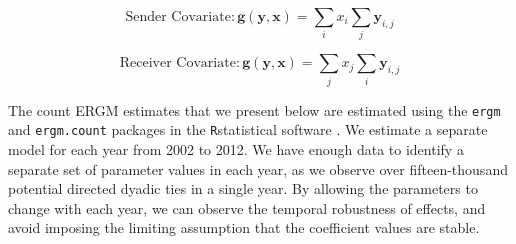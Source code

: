 \documentclass{article}
\newcommand{\R}{\texttt{R}} %
\begin{document}
$$ \text{Sender Covariate}: \bm{g(y,x)} = \sum_{i}x_i \sum_{j} \bm{y}_{i,j}$$

$$ \text{Receiver Covariate}: \bm{g(y,x)} = \sum_{j}x_j \sum_{i} \bm{y}_{i,j}$$

\noindent The count ERGM estimates that we present below are estimated using the \texttt{ergm} \citep{ergm} and \texttt{ergm.count} \citep{ergmcount} packages in the \R \space statistical software \citep{r}. We estimate a separate model for each year from 2002 to 2012. We have enough data to identify a separate set of parameter values in each year, as we observe over fifteen-thousand potential directed dyadic ties in a single year.  By allowing the parameters to change with each year, we can observe the temporal robustness of effects, and avoid imposing the limiting assumption that the coefficient values are stable. 
\end{document}
